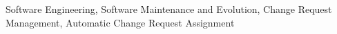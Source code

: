 

\begin{keywords}
Software Engineering, Software Maintenance and Evolution, Change Request
Management, Automatic Change Request Assignment
\end{keywords}